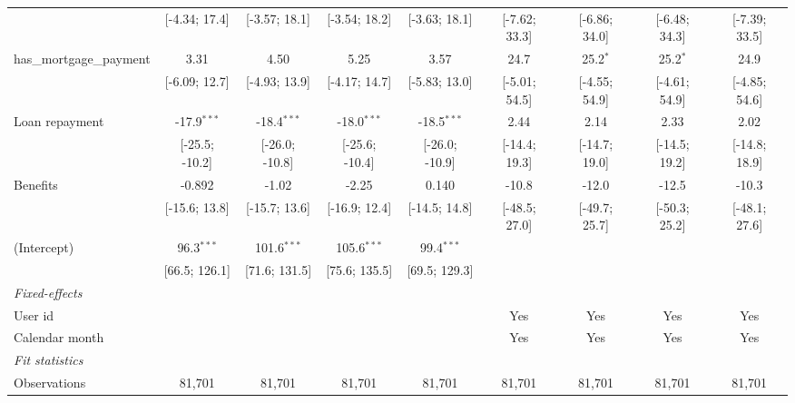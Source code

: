 \begin{table}[htbp]
\begin{threeparttable}[b]
\begin{tabular}{lcccccccc}
                                   & [-4.34; 17.4]  & [-3.57; 18.1]  & [-3.54; 18.2]   & [-3.63; 18.1]  & [-7.62; 33.3]   & [-6.86; 34.0]   & [-6.48; 34.3]   & [-7.39; 33.5]\\   
         has\_mortgage\_payment    & 3.31           & 4.50           & 5.25            & 3.57           & 24.7            & 25.2$^{*}$      & 25.2$^{*}$      & 24.9\\   
                                   & [-6.09; 12.7]  & [-4.93; 13.9]  & [-4.17; 14.7]   & [-5.83; 13.0]  & [-5.01; 54.5]   & [-4.55; 54.9]   & [-4.61; 54.9]   & [-4.85; 54.6]\\   
         Loan repayment            & -17.9$^{***}$  & -18.4$^{***}$  & -18.0$^{***}$   & -18.5$^{***}$  & 2.44            & 2.14            & 2.33            & 2.02\\   
                                   & [-25.5; -10.2] & [-26.0; -10.8] & [-25.6; -10.4]  & [-26.0; -10.9] & [-14.4; 19.3]   & [-14.7; 19.0]   & [-14.5; 19.2]   & [-14.8; 18.9]\\   
         Benefits                  & -0.892         & -1.02          & -2.25           & 0.140          & -10.8           & -12.0           & -12.5           & -10.3\\   
                                   & [-15.6; 13.8]  & [-15.7; 13.6]  & [-16.9; 12.4]   & [-14.5; 14.8]  & [-48.5; 27.0]   & [-49.7; 25.7]   & [-50.3; 25.2]   & [-48.1; 27.6]\\   
         (Intercept)               & 96.3$^{***}$   & 101.6$^{***}$  & 105.6$^{***}$   & 99.4$^{***}$   &                 &                 &                 &   \\   
                                   & [66.5; 126.1]  & [71.6; 131.5]  & [75.6; 135.5]   & [69.5; 129.3]  &                 &                 &                 &   \\   
         \midrule
         \emph{Fixed-effects}\\
         User id                   &                &                &                 &                & Yes             & Yes             & Yes             & Yes\\  
         Calendar month            &                &                &                 &                & Yes             & Yes             & Yes             & Yes\\  
         \midrule
         \emph{Fit statistics}\\
         Observations              & 81,701         & 81,701         & 81,701          & 81,701         & 81,701          & 81,701          & 81,701          & 81,701\\  

\end{tabular}
\end{threeparttable}
\end{table}
